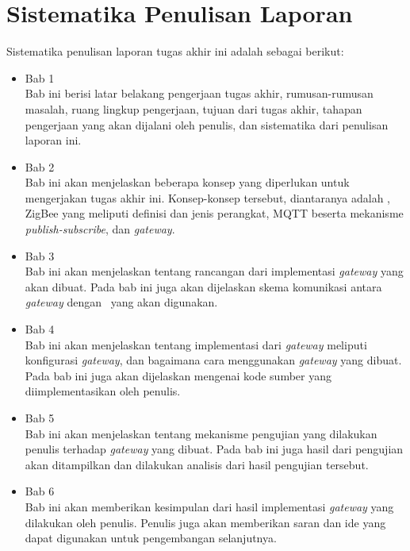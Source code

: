 \section{Sistematika Penulisan Laporan}
Sistematika penulisan laporan tugas akhir ini adalah sebagai berikut:
\begin{itemize}
	\item Bab 1 \babSatu \\
	Bab ini berisi latar belakang pengerjaan tugas akhir, rumusan-rumusan masalah, ruang lingkup pengerjaan, tujuan dari tugas akhir, tahapan pengerjaan yang akan dijalani oleh penulis, dan sistematika dari penulisan laporan ini.
	\item Bab 2 \babDua \\
	Bab ini akan menjelaskan beberapa konsep yang diperlukan untuk mengerjakan tugas akhir ini. Konsep-konsep tersebut, diantaranya adalah \iot, ZigBee yang meliputi definisi dan jenis perangkat,  MQTT beserta mekanisme \textit{publish-subscribe}, dan \textit{gateway}.
	\item Bab 3 \babTiga \\
	Bab ini akan menjelaskan tentang rancangan dari implementasi \textit{gateway} yang akan dibuat. Pada bab ini juga akan dijelaskan skema komunikasi antara \textit{gateway} dengan \plat~yang akan digunakan.
	\item Bab 4 \babEmpat \\
	Bab ini akan menjelaskan tentang implementasi dari \textit{gateway} meliputi konfigurasi \textit{gateway}, dan bagaimana cara menggunakan \textit{gateway} yang dibuat. Pada bab ini juga akan dijelaskan mengenai kode sumber yang diimplementasikan oleh penulis.
	\item Bab 5 \babLima \\
	Bab ini akan menjelaskan tentang mekanisme pengujian yang dilakukan penulis terhadap \textit{gateway} yang dibuat. Pada bab ini juga hasil dari pengujian akan ditampilkan dan dilakukan analisis dari hasil pengujian tersebut.
	\item Bab 6 \kesimpulan \\
	Bab ini akan memberikan kesimpulan dari hasil implementasi \textit{gateway} yang dilakukan oleh penulis. Penulis juga akan memberikan saran dan ide yang dapat digunakan untuk pengembangan selanjutnya.
\end{itemize}

